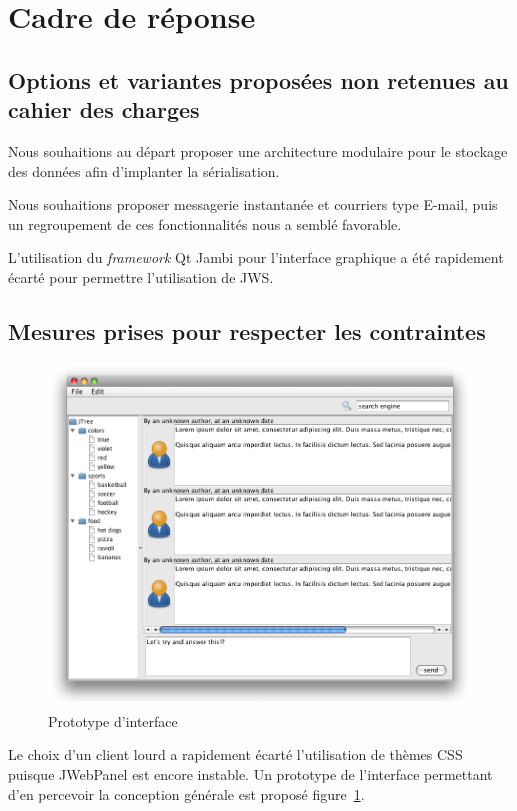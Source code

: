 \section{Cadre de réponse}

\subsection{Options et variantes proposées non retenues au cahier des charges}

Nous souhaitions au départ proposer une architecture modulaire pour le stockage des données afin d'implanter la sérialisation.

Nous souhaitions proposer messagerie instantanée et courriers type E-mail, puis un regroupement de ces fonctionnalités nous a semblé favorable.

L'utilisation du \emph{framework} Qt Jambi pour l'interface graphique a été rapidement écarté pour permettre l'utilisation de JWS.

\subsection{Mesures prises pour respecter les contraintes}

\begin{figure}[thbp]
	\centering
		\includegraphics[width=15cm]{proto_client.png}
	\caption{Prototype d'interface}
	\label{fig:proto}
\end{figure}

Le choix d'un client lourd a rapidement écarté l'utilisation de thèmes CSS puisque JWebPanel est encore instable. Un prototype de l'interface permettant d'en percevoir la conception générale est proposé figure~\ref{fig:proto}.

